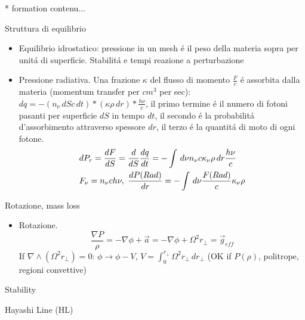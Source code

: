 \begin{frame}{* formation}
	contenu...
\end{frame}

\begin{frame}[fragile]{Struttura di equilibrio}\frameintoc
\begin{itemize}
\item Equilibrio idrostatico: pressione in un mesh \'e il peso della materia sopra per unit\'a di superficie. Stabilit\'a e tempi reazione a perturbazione
\item Pressione radiativa. Una frazione $\kappa$ del flusso di momento $\frac{F}{c}$ \'e assorbita dalla materia (momentum transfer per $cm^3$ per sec): $dq=-(n_{\nu}\,dSc\,dt)*(\kappa\rho\,dr)*\frac{h\nu}{c}$, il primo termine \'e il numero di fotoni pasanti per superficie $dS$ in tempo $dt$, il secondo \'e la probabilit\'a d'assorbimento attraverso spessore $dr$, il terzo \'e la quantit\'a di moto di ogni fotone.
\begin{align*}
&dP_r=\TDy{S}{F}=\TDof{S}\TDy{t}{q}=-\int \,d\nu n_{\nu}c\kappa_{\nu}\rho\,dr\frac{h\nu}{c}\\
&F_{\nu}=n_{\nu}ch\nu,\ \TDy{r}{P(Rad)}=-\int\,d\nu\frac{F(Rad)}{c}\kappa_{\nu}\rho
\end{align*}
\begin{comment}
Un elemento di volume $dS\,dr$ subisce per effetto dell'assorbimento della radiazione una variazione d'impulso $dq$, nel caso un fotone venga assorbito la variazione del flusso uscente \'e $dF<0$
The distribution of photons over over different quantum states with energies $\epsilon_k=\hbar\omega_k$ (large volume $\omega_k\to\omega$) 
\begin{align*}
\overline{n_k}=\frac{1}{\exp{\frac{\hbar\omega}{KT}}-1}
\end{align*}
Moltiplicando il numero di stati nel dato range di frequenze per la distribuzione di Plank (numero di occupazione) ottengo il numero di fotoni e l'energia radiativa nel range di frequenza
\begin{align*}
&dN_{\omega}=\frac{V}{\pi^2c^3}\frac{\omega^2\,d\omega}{\exp{\frac{\hbar\omega}{KT}}-1}\\
&dE_{\omega}=\frac{V\hbar}{\pi^2c^3}\frac{\omega^3\,d\omega}{\exp{\frac{\hbar\omega}{KT}}-1}
\end{align*}
\end{comment}
\end{itemize}
\end{frame}

\begin{frame}{Rotazione, mass loss}
\begin{itemize}
\item Rotazione. \[\frac{\nabla P}{\rho}=-\nabla\phi+\vec{a}=-\nabla\phi+\Omega^2r_{\perp}=\vec{g}_{eff}\]
If $\nabla\wedge(\Omega^2r_{\perp})=0$: $\phi\to\phi-V$, $V=\int_0^{r_{\perp}}\Omega^2r_{\perp}\,dr_{\perp}$ (OK if $P(\rho)$, politrope, regioni convettive)
\end{itemize}
\end{frame}

\begin{frame}{Stability}

\end{frame}

\begin{frame}{Hayashi Line (HL)}

\end{frame}
